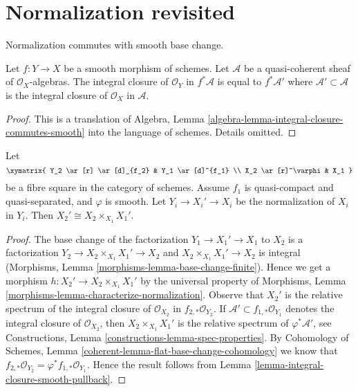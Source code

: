 \section{Normalization revisited}
\label{section-normalization}

\noindent
Normalization commutes with smooth base change.

\begin{lemma}
\label{lemma-integral-closure-smooth-pullback}
Let $f : Y \to X$ be a smooth morphism of schemes. Let $\mathcal{A}$ be a
quasi-coherent sheaf of $\mathcal{O}_X$-algebras. The integral closure
of $\mathcal{O}_Y$ in $f^*\mathcal{A}$ is equal to $f^*\mathcal{A}'$
where $\mathcal{A}' \subset \mathcal{A}$ is the integral closure of
$\mathcal{O}_X$ in $\mathcal{A}$.
\end{lemma}

\begin{proof}
This is a translation of
Algebra, Lemma \ref{algebra-lemma-integral-closure-commutes-smooth}
into the language of schemes. Details omitted.
\end{proof}

\begin{lemma}
\label{lemma-normalization-smooth-localization}
Let
$$
\xymatrix{
Y_2 \ar[r] \ar[d]_{f_2} & Y_1 \ar[d]^{f_1} \\
X_2 \ar[r]^\varphi & X_1
}
$$
be a fibre square in the category of schemes. Assume $f_1$ is quasi-compact
and quasi-separated, and $\varphi$ is smooth.
Let $Y_i \to X_i' \to X_i$ be the normalization of $X_i$ in $Y_i$.
Then $X_2' \cong X_2 \times_{X_1} X_1'$.
\end{lemma}

\begin{proof}
The base change of the factorization $Y_1 \to X_1' \to X_1$ to $X_2$
is a factorization $Y_2 \to X_2 \times_{X_1} X_1' \to X_2$ and
$X_2 \times_{X_1} X_1' \to X_2$ is integral
(Morphisms, Lemma \ref{morphisms-lemma-base-change-finite}).
Hence we get a morphism
$h : X_2' \to X_2 \times_{X_1} X_1'$ by the universal property of
Morphisms, Lemma \ref{morphisms-lemma-characterize-normalization}.
Observe that $X_2'$ is the relative spectrum of the integral closure
of $\mathcal{O}_{X_2}$ in $f_{2, *}\mathcal{O}_{Y_2}$.
If $\mathcal{A}' \subset f_{1, *}\mathcal{O}_{Y_1}$ denotes the integral
closure of $\mathcal{O}_{X_2}$, then $X_2 \times_{X_1} X_1'$ is the
relative spectrum of $\varphi^*\mathcal{A}'$, see
Constructions, Lemma \ref{constructions-lemma-spec-properties}.
By
Cohomology of Schemes, Lemma \ref{coherent-lemma-flat-base-change-cohomology}
we know that $f_{2, *}\mathcal{O}_{Y_2} = \varphi^*f_{1, *}\mathcal{O}_{Y_1}$.
Hence the result follows from
Lemma \ref{lemma-integral-closure-smooth-pullback}.
\end{proof}

